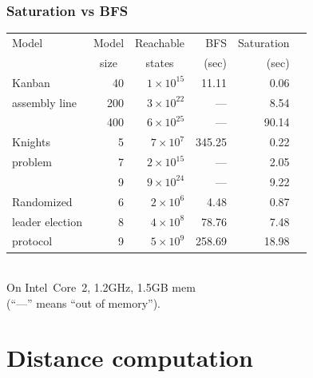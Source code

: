 \documentclass{beamer}
\begin{document}
\begin{frame}
  \frametitle{Saturation vs BFS}

  \begin{center}
    \begin{tabular}{|l|r||r||r|r|r|}
      \hline
      {\footnotesize Model} & \multicolumn{1}{|c||}{\footnotesize Model} & \multicolumn{1}{c||}{\footnotesize Reachable} & {\footnotesize BFS} & {\footnotesize Saturation} \\
      & \multicolumn{1}{|c||}{\footnotesize size}  & \multicolumn{1}{c||}{\footnotesize states}  & {\footnotesize (sec)} & {\footnotesize (sec)} \\
      \hline
      \hline
      {\footnotesize Kanban} & 40 & $1\times10^{15}$ &   11.11 &    0.06 \\
      {\footnotesize assembly line} & 200 & $3\times10^{22}$ & --- &    8.54 \\
      & 400 & $6\times10^{25}$ &   --- &   90.14 \\
      \hline
      \hline
      {\footnotesize Knights} & 5 & $7\times10^{7}$ & 345.25 &    0.22 \\
      {\footnotesize problem} & 7 & $2\times10^{15}$ &   --- &  2.05 \\
      & 9 & $9\times10^{24}$ &   --- &   9.22 \\
      \hline
      \hline
      {\footnotesize Randomized} & 6 & $2\times10^{6}$ &   4.48 &    0.87 \\
      {\footnotesize leader election} & 8 & $4\times10^{8}$ &   78.76 &  7.48 \\
      {\footnotesize protocol} & 9 & $5\times10^{9}$ &   258.69 &   18.98 \\
      \hline
    \end{tabular}\\
    On Intel~Core~2, 1.2GHz, 1.5GB mem\\(``---'' means ``out of memory'').
  \end{center}
\end{frame}

\section{Distance computation}
\end{document}
